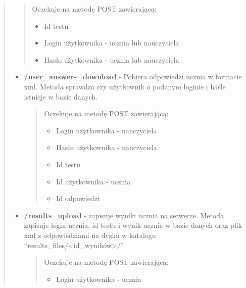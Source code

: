 \documentclass[letterpaper,10pt,polish]{manual}
\begin{document}
\begin{quote}
\begin{itemize}
\begin{quote}
Oczekuje na metodę POST zawierającą:
\begin{itemize}
\item {} 
Id testu

\item {} 
Login użytkownika - ucznia lub nauczyciela

\item {} 
Hasło użytkownika - ucznia lub nauczyciela

\end{itemize}
\end{quote}

\end{itemize}
\hypertarget{user-answers-download}{}\begin{itemize}
\item {} 
\textbf{/user\_answers\_download} - Pobiera odpowiedzi ucznia w formacie xml. Metoda sprawdza czy użytkownik o podanym loginie i haśle istnieje w bazie danych.
\begin{quote}

Oczekuje na metodę POST zawierającą:
\begin{itemize}
\item {} 
Login użytkownika - nauczyciela

\item {} 
Hasło użytkownika - nauczyciela

\item {} 
Id testu

\item {} 
Id użytkownika - ucznia

\item {} 
Id odpowiedzi

\end{itemize}
\end{quote}

\end{itemize}
\hypertarget{results-upload}{}\begin{itemize}
\item {} 
\textbf{/results\_upload} - zapisuje wyniki ucznia na serwerze. Metoda zapisuje login ucznia, id testu i wynik ucznia w bazie danych oraz plik xml z odpowiedziami na dysku w katalogu ``results\_files/\textless{}id\_wyników\textgreater{}/''.
\begin{quote}

Oczekuje na metodę POST zawierającą:
\begin{itemize}
\item {} 
Login użytkownika - ucznia


\end{itemize}
\end{quote}
\end{itemize}
\end{quote}
\end{document}
